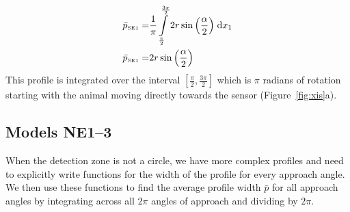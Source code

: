 \begin{align}
    \bar{p}_{\text{\tiny{SE1}}} =&\frac{1}{\pi} \int\limits_{\frac{\pi}{2}}^{\frac{3 \pi}{2}}2 r \sin{\left (\frac{\alpha}{2} \right )}\;\mathrm{d}x_{1}\label{pSE1Def}\\
    \bar{p}_{\text{\tiny{SE1}}}  =& 2 r \sin{\left (\frac{\alpha}{2} \right )}\label{pSE1Sln}
\end{align}
This profile is integrated over the interval $[\frac{\pi}{2}, \frac{3\pi}{2}]$ which is $\pi$ radians of rotation starting with the animal moving directly towards the sensor (Figure~\ref{fig:xis}a).

\subsection{ Models NE1--3} \label{NE}

When the detection zone is not a circle, we have more complex profiles  and need to explicitly write functions for the width of the profile for every approach angle.
We then use these functions to find the average profile width $\bar{p}$ for all approach angles by integrating across all $2\pi$ angles of approach and dividing by $2\pi$.




